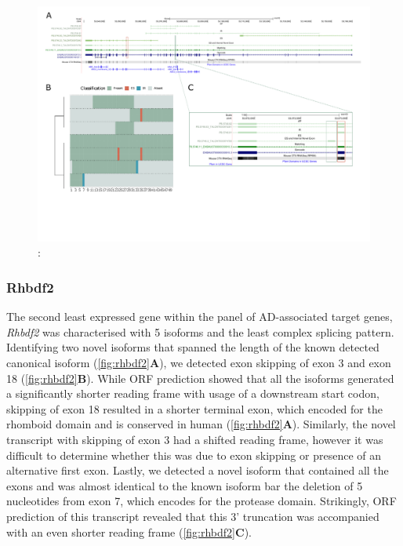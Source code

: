 \begin{landscape}
	\begin{figure}[htp]
		\begin{center}
			\includegraphics[page=14,trim={0 1cm 0 0},scale = 0.85]{Figures/TargetGenes_Annotation_Landscape.pdf}
		\end{center}
		\captionsetup{width=0.95\textwidth}
		\caption[RNA-Seq defined transcriptome]%
		{\textbf{}: }   
		\label{fig:trpa1}
	\end{figure}
\end{landscape}

\newpage
\subsubsection{Rhbdf2}
The second least expressed gene within the panel of AD-associated target genes, \textit{Rhbdf2} was characterised with 5 isoforms and the least complex splicing pattern. Identifying two novel isoforms that spanned the length of the known detected canonical isoform (\cref{fig:rhbdf2}\textbf{A}), we detected exon skipping of exon 3 and exon 18 (\cref{fig:rhbdf2}\textbf{B}). While ORF prediction showed that all the isoforms generated a significantly shorter reading frame with usage of a downstream start codon, skipping of exon 18 resulted in a shorter terminal exon, which encoded for the rhomboid domain and is conserved in human (\cref{fig:rhbdf2}\textbf{A}). Similarly, the novel transcript with skipping of exon 3 had a shifted reading frame, however it was difficult to determine whether this was due to exon skipping or presence of an alternative first exon. Lastly, we detected a novel isoform that contained all the exons and was almost identical to the known isoform bar the deletion of 5 nucleotides from exon 7, which encodes for the protease domain. Strikingly, ORF prediction of this transcript revealed that this 3' truncation was accompanied with an even shorter reading frame (\cref{fig:rhbdf2}\textbf{C}).   

